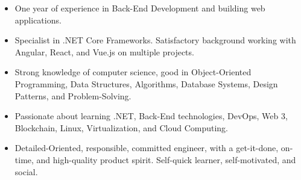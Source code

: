 





\begin{itemize}
    \item One year of experience in Back-End Development and building web applications.
    \item Specialist in .NET Core Frameworks. Satisfactory background working with Angular, React, and Vue.js on multiple projects.
    \item Strong knowledge of computer science, good in Object-Oriented Programming, Data Structures, Algorithms, Database Systems, Design Patterns, and Problem-Solving.
    \item Passionate about learning .NET, Back-End technologies, DevOps, Web 3, Blockchain, Linux, Virtualization, and Cloud Computing.
    \item Detailed-Oriented, responsible, committed engineer, with a get-it-done, on-time, and high-quality product spirit. Self-quick learner, self-motivated, and social.
\end{itemize}
